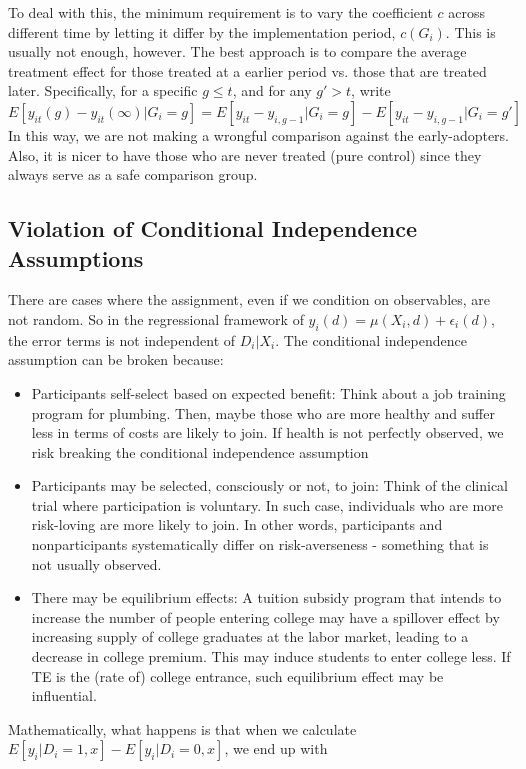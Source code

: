 \documentclass[12pt]{article}
\theoremstyle{definition}
\theoremstyle{property}
\theoremstyle{assumption}
\theoremstyle{example}
\theoremstyle{comment}
\begin{document}
\par
To deal with this, the minimum requirement is to vary the coefficient $c$ across different time by letting it differ by the implementation period, $c(G_i)$. This is usually not enough, however. The best approach is to compare the average treatment effect for those treated at a earlier period vs. those that are treated later. Specifically, for a specific $g\leq t$,  and for any $g'>t$, write
\[
E[y_{it}(g)-y_{it}(\infty)|G_i=g]=E[y_{it}-y_{i,g-1}|G_i=g]-E[y_{it}-y_{i,g-1}|G_i=g']
\]
In this way, we are not making a wrongful comparison against the early-adopters. Also, it is nicer to have those who are never treated (pure control) since they always serve as a safe comparison group. 
\subsection{Violation of Conditional Independence Assumptions}
There are cases where the assignment, even if we condition on observables, are not random. So in the regressional framework of $y_{i}(d)=\mu(X_i,d)+\epsilon_i(d)$, the error terms is not independent of $D_i|X_i$. The conditional independence assumption can be broken because:
\begin{itemize}
\item Participants self-select based on expected benefit: Think about a job training program for plumbing. Then, maybe those who are more healthy and suffer less in terms of costs are likely to join. If health is not perfectly observed, we risk breaking the conditional independence assumption
\item Participants may be selected, consciously or not, to join: Think of the clinical trial where participation is voluntary. In such case, individuals who are more risk-loving are more likely to join. In other words, participants and nonparticipants systematically differ on risk-averseness - something that is not usually observed.
\item There may be equilibrium effects: A tuition subsidy program that intends to increase the number of people entering college may have a spillover effect by increasing supply of college graduates at the labor market, leading to a decrease in college premium. This may induce students to enter college less. If TE is the (rate of) college entrance, such equilibrium effect may be influential.  
\end{itemize}
\par
Mathematically, what happens is that when we calculate $E[y_i|D_i=1,x]-E[y_i|D_i=0,x]$, we end up with
\end{document}
